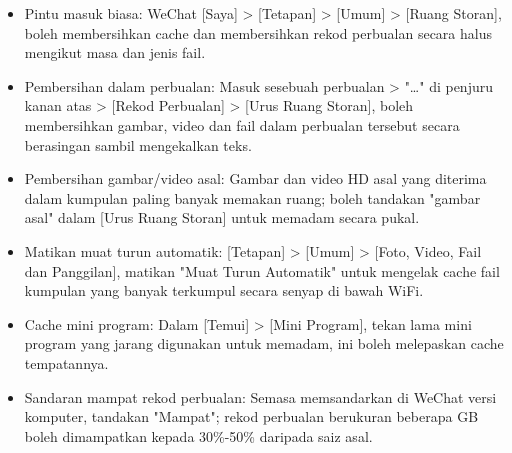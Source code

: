 
\begin{itemize}
  \item Pintu masuk biasa: WeChat [Saya] > [Tetapan] > [Umum] > [Ruang Storan], boleh membersihkan cache dan membersihkan rekod perbualan secara halus mengikut masa dan jenis fail.
  \item Pembersihan dalam perbualan: Masuk sesebuah perbualan > "…" di penjuru kanan atas > [Rekod Perbualan] > [Urus Ruang Storan], boleh membersihkan gambar, video dan fail dalam perbualan tersebut secara berasingan sambil mengekalkan teks.
  \item Pembersihan gambar/video asal: Gambar dan video HD asal yang diterima dalam kumpulan paling banyak memakan ruang; boleh tandakan "gambar asal" dalam [Urus Ruang Storan] untuk memadam secara pukal.
  \item Matikan muat turun automatik: [Tetapan] > [Umum] > [Foto, Video, Fail dan Panggilan], matikan "Muat Turun Automatik" untuk mengelak cache fail kumpulan yang banyak terkumpul secara senyap di bawah WiFi.
  \item Cache mini program: Dalam [Temui] > [Mini Program], tekan lama mini program yang jarang digunakan untuk memadam, ini boleh melepaskan cache tempatannya.
  \item Sandaran mampat rekod perbualan: Semasa memsandarkan di WeChat versi komputer, tandakan "Mampat"; rekod perbualan berukuran beberapa GB boleh dimampatkan kepada 30\%-50\% daripada saiz asal.
\end{itemize}


